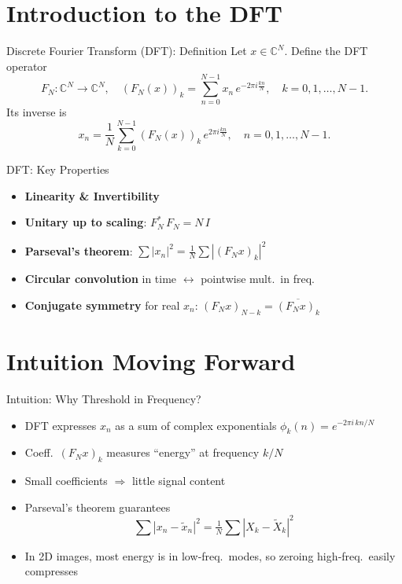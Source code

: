 \documentclass[12pt]{beamer}
\begin{document}
\section{Introduction to the DFT}

\begin{frame}{Discrete Fourier Transform (DFT): Definition}
  Let \(x \in \mathbb{C}^N\).  Define the DFT operator
  \[
    F_N : \mathbb{C}^N \rightarrow \mathbb{C}^N,
    \quad
    (F_N(x))_k
      = \sum_{n=0}^{N-1} x_n \, e^{-2\pi i \tfrac{k n}{N}},
    \quad k = 0,1,\dots,N-1.
  \]
  Its inverse is
  \[
    x_n
      = \frac{1}{N}
        \sum_{k=0}^{N-1} (F_N(x))_k \, e^{2\pi i \tfrac{k n}{N}},
    \quad n = 0,1,\dots,N-1.
  \]
\end{frame}

\begin{frame}{DFT: Key Properties}
  \begin{itemize}
    \item \textbf{Linearity \& Invertibility}
    \item \textbf{Unitary up to scaling}: $F_N^*\,F_N = N\,I$
    \item \textbf{Parseval’s theorem}: 
      $\sum|x_n|^2 = \tfrac1N\sum|(F_Nx)_k|^2$
    \item \textbf{Circular convolution} in time $\leftrightarrow$ pointwise mult.\ in freq.
    \item \textbf{Conjugate symmetry} for real $x_n$: 
      $(F_Nx)_{N-k} = \overline{(F_Nx)_k}$
  \end{itemize}
\end{frame}

\section{Intuition Moving Forward}
\begin{frame}{Intuition: Why Threshold in Frequency?}
  \begin{itemize}
    \item DFT expresses $x_n$ as a sum of complex exponentials
      $\phi_k(n)=e^{-2\pi i\,kn/N}$
    \item Coeff.\ $(F_Nx)_k$ measures “energy” at frequency $k/N$
    \item Small coefficients $\Rightarrow$ little signal content
    \item Parseval’s theorem guarantees
      \[
        \sum|x_n-\tilde x_n|^2
        = \tfrac1N\sum|X_k-\tilde X_k|^2
      \]
    \item In 2D images, most energy is in low‐freq.\ modes, so zeroing high‐freq.\ easily compresses
  \end{itemize}
\end{frame}
\end{document}
